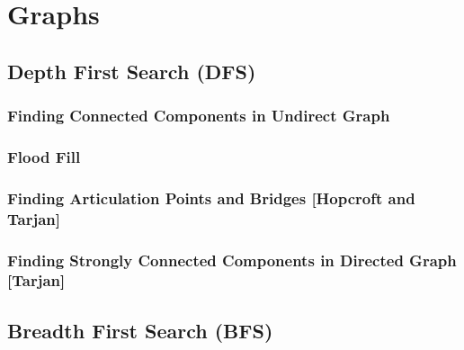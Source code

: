 \chapter{Graphs}
\section {Depth First Search (DFS)}
	
	\subsection {Finding Connected Components in Undirect Graph}
		
	\subsection {Flood Fill}
		
	\subsection {Finding Articulation Points and Bridges [Hopcroft and Tarjan]}
		
                
	\subsection {Finding Strongly Connected Components in Directed Graph [Tarjan]}
		
                
\section {Breadth First Search (BFS)}
	
